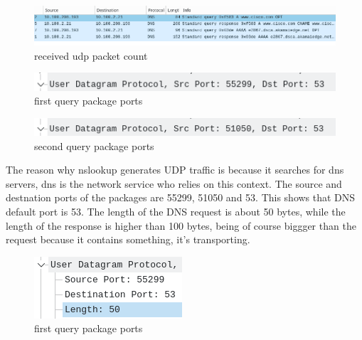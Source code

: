 \begin{figure}[htbp]
	\centering
	\includegraphics[width=1\linewidth]{img/7.png}
	\caption{received udp packet count}\label{fig:7}
\end{figure}

\begin{figure}[htbp]
	\centering
	\includegraphics[width=1\linewidth]{img/8.png}
	\caption{first query package ports}\label{fig:8}
\end{figure}

\begin{figure}[htbp]
	\centering
	\includegraphics[width=1\linewidth]{img/9.png}
	\caption{second query package ports}\label{fig:9}
\end{figure}

The reason why nslookup generates UDP traffic is because it searches for dns
servers, dns is the network service who relies on this context. The source and
destnation ports of the packages are 55299, 51050 and 53. This shows that DNS
default port is 53. The length of the DNS request is about 50 bytes, while the
length of the response is higher than 100 bytes, being of course biggger than
the request because it contains something, it's transporting.

\begin{figure}[htbp]
	\centering
	\includegraphics[width=1\linewidth]{img/10.png}
	\caption{first query package ports}\label{fig:10}
\end{figure}

